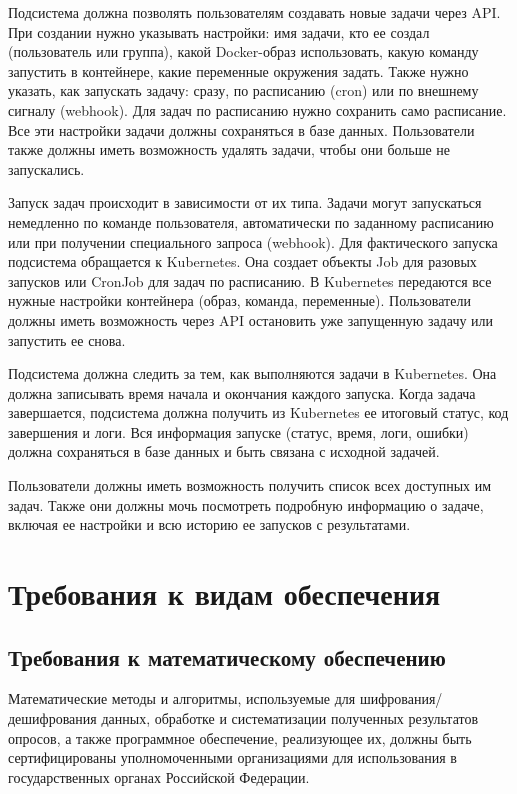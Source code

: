 Подсистема должна позволять пользователям создавать новые задачи через API. При создании нужно указывать настройки: имя задачи, кто ее создал (пользователь или группа), какой Docker-образ использовать, какую команду запустить в контейнере, какие переменные окружения задать. Также нужно указать, как запускать задачу: сразу, по расписанию (cron) или по внешнему сигналу (webhook). Для задач по расписанию нужно сохранить само расписание. Все эти настройки задачи должны сохраняться в базе данных. Пользователи также должны иметь возможность удалять задачи, чтобы они больше не запускались.

Запуск задач происходит в зависимости от их типа. Задачи могут запускаться немедленно по команде пользователя, автоматически по заданному расписанию или при получении специального запроса (webhook). Для фактического запуска подсистема обращается к Kubernetes. Она создает объекты Job для разовых запусков или CronJob для задач по расписанию. В Kubernetes передаются все нужные настройки контейнера (образ, команда, переменные). Пользователи должны иметь возможность через API остановить уже запущенную задачу или запустить ее снова.

Подсистема должна следить за тем, как выполняются задачи в Kubernetes. Она должна записывать время начала и окончания каждого запуска. Когда задача завершается, подсистема должна получить из Kubernetes ее итоговый статус, код завершения и логи. Вся информация запуске (статус, время, логи, ошибки) должна сохраняться в базе данных и быть связана с исходной задачей.

Пользователи должны иметь возможность получить список всех доступных им задач. Также они должны мочь посмотреть подробную информацию о задаче, включая ее настройки и всю историю ее запусков с результатами.

\section{Требования к видам обеспечения}

\subsection{Требования к математическому обеспечению}

Математические методы и алгоритмы, используемые для шифрования/дешифрования данных, обработке и систематизации полученных результатов опросов, а также программное обеспечение, реализующее их, должны быть сертифицированы уполномоченными организациями для использования в государственных органах Российской Федерации.

